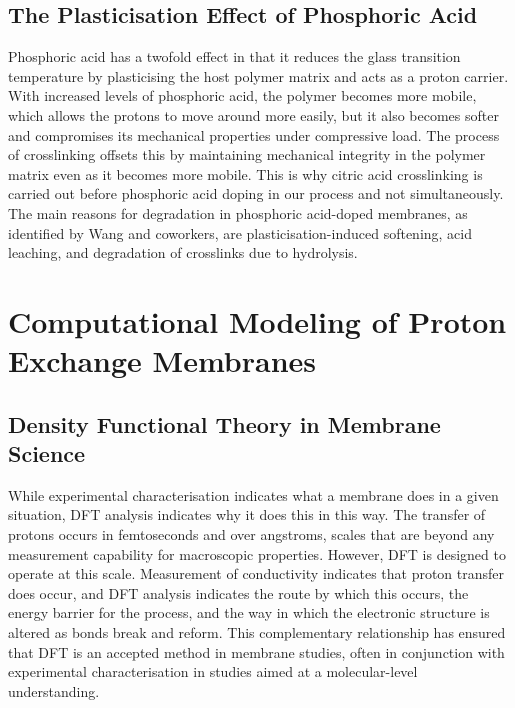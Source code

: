\documentclass[12pt,a4paper]{report}
\begin{document}
\subsection{The Plasticisation Effect of Phosphoric Acid}
Phosphoric acid has a twofold effect in that it reduces the glass transition temperature by plasticising the host polymer matrix and acts as a proton carrier. With increased levels of phosphoric acid, the polymer becomes more mobile, which allows the protons to move around more easily, but it also becomes softer and compromises its mechanical properties under compressive load.\cite{4} The process of crosslinking offsets this by maintaining mechanical integrity in the polymer matrix even as it becomes more mobile. This is why citric acid crosslinking is carried out before phosphoric acid doping in our process and not simultaneously.\cite{35,53} The main reasons for degradation in phosphoric acid-doped membranes, as identified by Wang and coworkers, are plasticisation-induced softening, acid leaching, and degradation of crosslinks due to hydrolysis.\cite{58}

\section{Computational Modeling of Proton Exchange Membranes}
\subsection{Density Functional Theory in Membrane Science}
While experimental characterisation indicates what a membrane does in a given situation, DFT analysis indicates why it does this in this way. The transfer of protons occurs in femtoseconds and over angstroms, scales that are beyond any measurement capability for macroscopic properties. However, DFT is designed to operate at this scale. Measurement of conductivity indicates that proton transfer does occur, and DFT analysis indicates the route by which this occurs, the energy barrier for the process, and the way in which the electronic structure is altered as bonds break and reform. This complementary relationship has ensured that DFT is an accepted method in membrane studies, often in conjunction with experimental characterisation in studies aimed at a molecular-level understanding.\cite{18,19}
\end{document}

